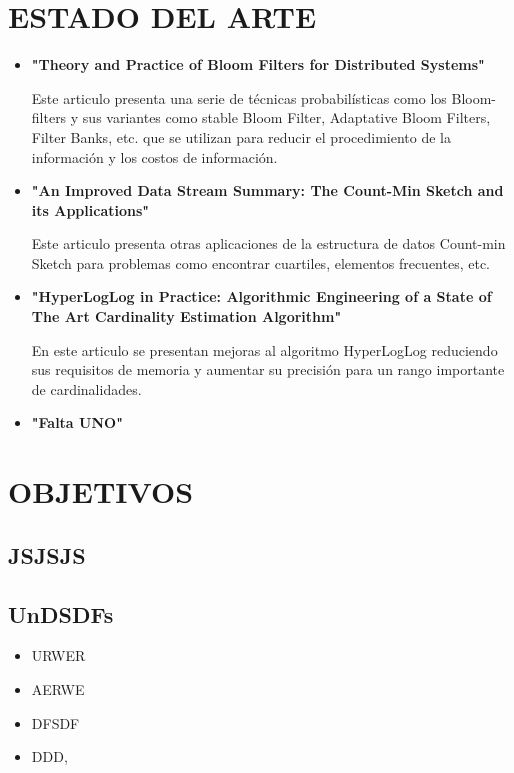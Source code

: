 \documentclass[journal]{IEEEtran}
\begin{document}
\section{ESTADO DEL ARTE}

\begin{itemize}

\item \textbf{"Theory and Practice of Bloom Filters for Distributed Systems"}

Este articulo presenta una serie de técnicas probabilísticas como los Bloom-filters y sus variantes como stable Bloom Filter, Adaptative Bloom Filters, Filter Banks, etc. que se utilizan para reducir el procedimiento de la información y los costos de información.\\

\item \textbf{"An Improved Data Stream Summary: The Count-Min Sketch and its Applications"}

Este articulo presenta otras aplicaciones de la estructura de datos Count-min Sketch para problemas como encontrar cuartiles, elementos frecuentes, etc.\\

\item \textbf{"HyperLogLog in Practice: Algorithmic Engineering of a State of The Art Cardinality Estimation Algorithm"}

En este articulo se presentan mejoras al algoritmo HyperLogLog reduciendo sus requisitos de memoria y aumentar su precisión para un rango importante de cardinalidades.\\

\item \bf"Falta UNO" 

\end{itemize}


\section{OBJETIVOS}


\subsection{JSJSJS}

\subsection{UnDSDFs}

\begin{itemize}

\item URWER 
\item AERWE
\item DFSDF
\item DDD, 

\end{itemize}
\end{document}
